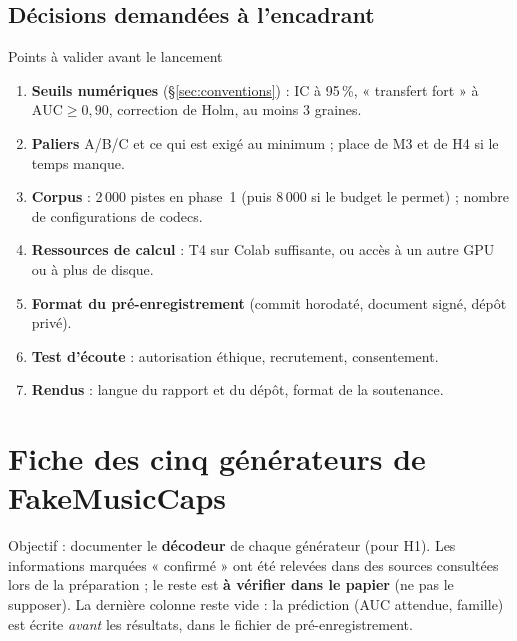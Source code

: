 \documentclass[11pt,a4paper]{article}
\newcommand{\AUC}{\textrm{AUC}}
\begin{document}
\subsection{Décisions demandées à l'encadrant}
\label{sec:decisions}

\begin{encadre}{Points à valider avant le lancement}
\begin{enumerate}
  \item \textbf{Seuils numériques} (\S\ref{sec:conventions}) : IC à 95\,\%, « transfert fort » à $\AUC\geq 0{,}90$, correction de Holm, au moins 3 graines.
  \item \textbf{Paliers} A/B/C et ce qui est exigé au minimum ; place de M3 et de H4 si le temps manque.
  \item \textbf{Corpus} : 2\,000 pistes en phase~1 (puis 8\,000 si le budget le permet) ; nombre de configurations de codecs.
  \item \textbf{Ressources de calcul} : T4 sur Colab suffisante, ou accès à un autre GPU ou à plus de disque.
  \item \textbf{Format du pré-enregistrement} (commit horodaté, document signé, dépôt privé).
  \item \textbf{Test d'écoute} : autorisation éthique, recrutement, consentement.
  \item \textbf{Rendus} : langue du rapport et du dépôt, format de la soutenance.
\end{enumerate}
\end{encadre}

\appendix

\section{Fiche des cinq générateurs de FakeMusicCaps}
\label{app:generateurs}

Objectif : documenter le \textbf{décodeur} de chaque générateur (pour H1). Les informations marquées « confirmé » ont été relevées dans des sources consultées lors de la préparation ; le reste est \textbf{à vérifier dans le papier} (ne pas le supposer). La dernière colonne reste vide : la prédiction (AUC attendue, famille) est écrite \emph{avant} les résultats, dans le fichier de pré-enregistrement.
\end{document}
